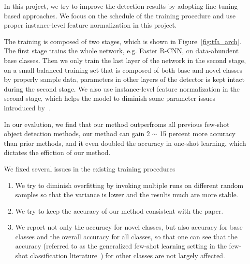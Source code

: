 In this project, we try to improve the detection results by adopting fine-tuning based approaches. We focus on the schedule of the training procedure and use proper instance-level feature normalization in this project.

The training is composed of two stages, which is shown in Figure~\ref{fig:tfa_arch}. The first stage trains the whole network, e.g. Faster R-CNN, on data-abundent base classes. Then we only train the last layer of the network in the second stage, on a small balanced training set that is composed of both base and novel classes by properly sample data, parameters in other layers of the detector is kept intact during the second stage. We also use instance-level feature normalization in the second stage, which helps the model to diminish some parameter issues introduced by~\citet{gidaris2018dynamic,qi2018low,chen2019closer}.

In our evalution, we find that our method outperfroms all previous few-shot object detection methods, our method can gain 2 $\sim$ 15 percent more accuracy than prior methods, and it even doubled the accuracy in one-shot learning, which dictates the effiction of our method.

We fixed several issues in the existing training procedures
\begin{enumerate}
    \item We try to diminish overfitting by invoking multiple runs on different random samples so that the variance is lower and the results much are more stable.
    \item We try to keep the accuracy of our method consistent with the paper.
    \item We report not only the accuracy for novel classes, but also accuracy for base classes and the overall accuracy for all classes, so that one can see that the accuracy (referred to as the generalized few-shot learning setting in the few-shot classification literature~\cite{hariharan2017low,wang2019tafe}) for other classes are not largely affected.
\end{enumerate}
